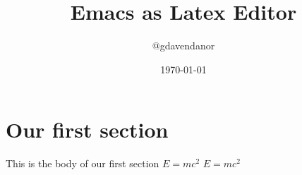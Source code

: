 \documentclass{article}
\title{Emacs as Latex Editor}
\author{@gdavendanor}
\date{\today}
\begin{document}
\maketitle
\section{Our first section}
This is the body of our first section $E=mc^2$
$E=mc^2$
\end{document}

